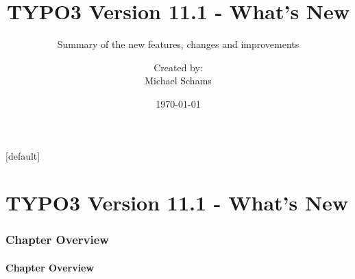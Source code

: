 \documentclass[t]{beamer}
\title{TYPO3 Version 11.1 - What's New}
\subtitle{Summary of the new features, changes and improvements}
\author{
	\centerline{Created by:}
	\centerline{Michael Schams}
}
\date{\today}
\begin{document}
\sharefont


\begingroup
	[default]
	\begin{frame}
		\titlepage
	\end{frame}
\endgroup


\section*{TYPO3 Version 11.1 - What's New}
\begin{frame}[fragile]
	\frametitle{Chapter Overview}
	\framesubtitle{Chapter Overview}

	\tableofcontents

\end{frame}

























\end{document}

